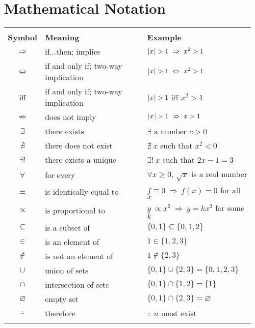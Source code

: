 \section*{Mathematical Notation}
\begin{tabular}{@{}c!{\qquad}l!{\quad\quad}l@{}}
\hline\\[0.5pt]
\textbf{Symbol} & \textbf{Meaning} & \textbf{Example}\\[6pt]
$\Rightarrow$ & if...then; implies & $\lvert\mspace{1mu}x\mspace{1mu}\rvert > 1 ~\Rightarrow~ x^2 > 1$\\[3pt]
$\Leftrightarrow$ & if and only if; two-way implication & $\lvert\mspace{1mu}x\mspace{1mu}\rvert > 1 ~\Leftrightarrow~ x^2 > 1$\\[3pt]
iff & if and only if; two-way implication & $\lvert\mspace{1mu}x\mspace{1mu}\rvert > 1$ iff $x^2 > 1$\\[3pt]
$\nRightarrow$ & does not imply & $\lvert\mspace{1mu}x\mspace{1mu}\rvert > 1 ~\nRightarrow~ x > 1$\\[3pt]
$\exists$ & there exists & $\exists$ a number $c > 0$\\[3pt]
$\nexists$ & there does not exist & $\nexists ~x$ such that $x^2 < 0$\\[3pt]
$\exists !$ & there exists a unique & $\exists !~x$ such that $2x-1=3$\\[3pt]
$\forall$ & for every & $\forall x \ge 0$, $\sqrt{x}$ is a real number\\[3pt]
$\equiv$ & is identically equal to & $f \equiv 0 ~\Rightarrow~ f(x)=0$ for all $x$\\[3pt]
$\propto$ & is proportional to & $y ~\propto x^2 ~\Rightarrow~ y=kx^2$ for some $k$\\[3pt]
$\subseteq$ & is a subset of & $\lbrace 0,1 \rbrace \subseteq \lbrace 0,1,2 \rbrace$\\[3pt]
$\in$ & is an element of & $1 \in \lbrace 1,2,3 \rbrace$\\[3pt]
$\notin$ & is not an element of & $1 \notin \lbrace 2,3 \rbrace$\\[3pt]
$\cup$ & union of sets & $\lbrace 0,1 \rbrace \cup \lbrace 2,3 \rbrace = \lbrace 0,1,2,3 \rbrace$\\[3pt]
$\cap$ & intersection of sets & $\lbrace 0,1 \rbrace \cap \lbrace 1,2 \rbrace = \lbrace 1 \rbrace$\\[3pt]
$\varnothing$ & empty set & $\lbrace 0,1 \rbrace \cap \lbrace 2,3 \rbrace = \varnothing$\\[3pt]
$\therefore$ & therefore & $\therefore$ $n$ must exist\\[0.5pt]\\
\hline
\end{tabular}
